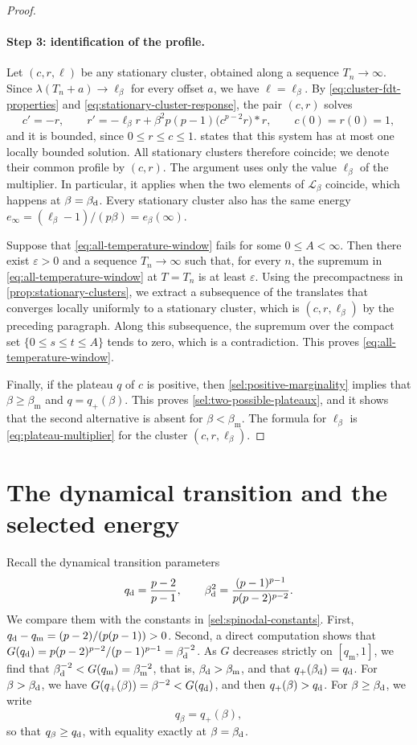 \begin{proof}
\paragraph{Step 3: identification of the profile.}
Let $(c,r,\ell)$ be any stationary cluster, obtained along a sequence $T_n\to\infty$. Since $\lambda(T_n+a)\to\ell_\beta$ for every offset $a$, we have $\ell=\ell_\beta$. By \eqref{eq:cluster-fdt-properties} and \eqref{eq:stationary-cluster-response}, the pair $(c,r)$ solves
\[
 c'=-r,\qquad
 r'=-\ell_\beta r+\beta^2p(p-1)\bigl(c^{p-2}r\bigr)*r,\qquad
 c(0)=r(0)=1,
\]
and it is bounded, since $0\le r\le c\le1$.  states that this system has at most one locally bounded solution. All stationary clusters therefore coincide; we denote their common profile by $(c,r)$. The argument uses only the value $\ell_\beta$ of the multiplier. In particular, it applies when the two elements of $\mathcal L_\beta$ coincide, which happens at $\beta=\beta_{\mathrm d}$. Every stationary cluster also has the same energy $e_\infty=(\ell_\beta-1)/(p\beta)=e_\beta(\infty)$.

Suppose that \eqref{eq:all-temperature-window} fails for some $0\le A<\infty$. Then there exist $\varepsilon>0$ and a sequence $T_n\to\infty$ such that, for every $n$, the supremum in \eqref{eq:all-temperature-window} at $T=T_n$ is at least $\varepsilon$. Using the precompactness in \cref{prop:stationary-clusters}, we extract a subsequence of the translates that converges locally uniformly to a stationary cluster, which is $(c,r,\ell_\beta)$ by the preceding paragraph. Along this subsequence, the supremum over the compact set $\{0\le s\le t\le A\}$ tends to zero, which is a contradiction. This proves \eqref{eq:all-temperature-window}.

Finally, if the plateau $q$ of $c$ is positive, then \cref{sel:positive-marginality} implies that $\beta\ge\beta_{\mathrm m}$ and $q=q_+(\beta)$. This proves \eqref{sel:two-possible-plateaux}, and it shows that the second alternative is absent for $\beta<\beta_{\mathrm m}$. The formula for $\ell_\beta$ is \eqref{eq:plateau-multiplier} for the cluster $(c,r,\ell_\beta)$.
\end{proof}

\section{The dynamical transition and the selected energy}\label{sec:selected-sector}

Recall the dynamical transition parameters
\[
 q_{\mathrm d}=\frac{p-2}{p-1},\qquad
 \beta_{\mathrm d}^2=\frac{(p-1)^{p-1}}{p(p-2)^{p-2}}.
\]
We compare them with the constants in \eqref{sel:spinodal-constants}. First, $q_{\mathrm d}-q_{\mathrm m}=(p-2)/(p(p-1))>0$. Second, a direct computation shows that $G(q_{\mathrm d})=p(p-2)^{p-2}/(p-1)^{p-1}=\beta_{\mathrm d}^{-2}$. As $G$ decreases strictly on $[q_{\mathrm m},1]$, we find that $\beta_{\mathrm d}^{-2}<G(q_{\mathrm m})=\beta_{\mathrm m}^{-2}$, that is, $\beta_{\mathrm d}>\beta_{\mathrm m}$, and that $q_+(\beta_{\mathrm d})=q_{\mathrm d}$. For $\beta>\beta_{\mathrm d}$, we have $G(q_+(\beta))=\beta^{-2}<G(q_{\mathrm d})$, and then $q_+(\beta)>q_{\mathrm d}$. For $\beta\ge\beta_{\mathrm d}$, we write
\[
 q_\beta=q_+(\beta),
\]
so that $q_\beta\ge q_{\mathrm d}$, with equality exactly at $\beta=\beta_{\mathrm d}$.

